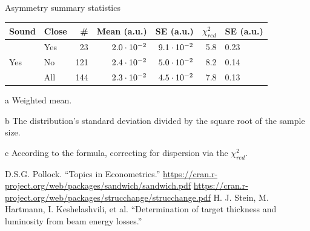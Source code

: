\documentclass{report}
\begin{document}
\begin{threeparttable}
	\centering
	\caption{Asymmetry summary statistics\label{tbl:AyySumStat}}
	\begin{tabular}{llrrrrl}
		\hline\hline
		Sound                & Close &  \# & Mean\tnote{a} (a.u.) & SE\tnote{b} (a.u.) & $\chi^2_{red}$ & SE\tnote{c} (a.u.) \\ \hline
		\multirow{3}{*}{Yes} & Yes   &  23 &       $2.0\cdot10^{-2}$ &       $9.1\cdot10^{-2}$ &            5.8 & 0.23               \\
		                     & No    & 121 &       $2.4\cdot10^{-2}$ &       $5.0\cdot10^{-2}$ &            8.2 & 0.14               \\
		                     & All   & 144 &       $2.3\cdot10^{-2}$ &     $4.5\cdot10^{-2}$ &            7.8 & 0.13               \\ \hline
	\end{tabular}
	\begin{tablenotes}
		\item[a]{Weighted mean.}
		\item[b]{The distribution's standard deviation divided by the square root of the sample size.}
		\item[c]{According to the formula, correcting for dispersion via the $\chi^2_{red}$.}
	\end{tablenotes}
\end{threeparttable}

\begin{thebibliography}{9}
	D.S.G. Pollock. ``Topics in Econometrics.''
	\url{https://cran.r-project.org/web/packages/sandwich/sandwich.pdf}
	\url{https://cran.r-project.org/web/packages/strucchange/strucchange.pdf}
	H. J. Stein, M. Hartmann, I. Keshelashvili, et al. ``Determination of target thickness and luminosity from beam energy losses.''
\end{thebibliography}
\end{document}
